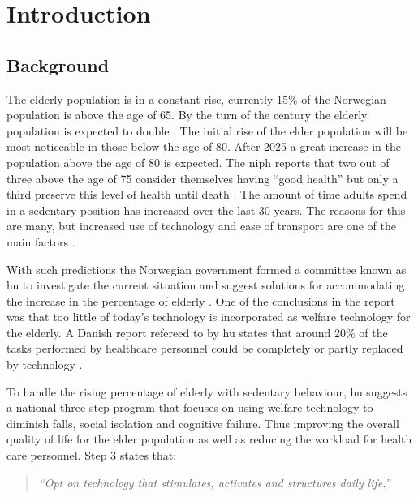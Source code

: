 \chapter{Introduction}

\section{Background}

The elderly population is in a constant rise, currently 15\% of the Norwegian population is above the age of 65. By the turn of the century the elderly population is expected to double \cite{elder}. The initial rise of the elder population will be most noticeable in those below the age of 80. After 2025 a great increase in the population above the age of 80 is expected. The \gls{niph} reports that two out of three above the age of 75 consider themselves having ``good health'' but only a third preserve this level of health until death \cite{elder}. The amount of time adults spend in a sedentary position has increased over the last 30 years. The reasons for this are many, but increased use of technology and ease of transport are one of the main factors \cite{sedentaryBehaviour}. %

With such predictions the Norwegian government formed a committee known as \gls{hu} to investigate the current situation and suggest solutions for accommodating the increase in the percentage of elderly \cite{haagen}. One of the conclusions in the report was that too little of today's technology is incorporated as welfare technology for the elderly. A Danish report refereed to by \gls{hu} states that around 20\% of the tasks performed by healthcare personnel could be completely or partly replaced by technology \cite{kmd}. 

To handle the rising percentage of elderly with sedentary behaviour, \gls{hu} suggests a national three step program that focuses on using welfare technology to diminish falls, social isolation and cognitive failure. Thus improving the overall quality of life for the elder population as well as reducing the workload for health care personnel. Step 3 states that:
\begin{quote}
\textit{``Opt on technology that stimulates, activates and structures daily life.''}
\end{quote}
 
